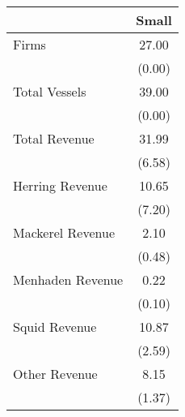 \begin{tabular}{l*{1}{c}}
\hline\hline
                &    Small\\
\hline
Firms           &    27.00\\
                &   (0.00)\\
Total Vessels   &    39.00\\
                &   (0.00)\\
Total Revenue   &    31.99\\
                &   (6.58)\\
Herring Revenue &    10.65\\
                &   (7.20)\\
Mackerel Revenue&     2.10\\
                &   (0.48)\\
Menhaden Revenue&     0.22\\
                &   (0.10)\\
Squid Revenue   &    10.87\\
                &   (2.59)\\
Other Revenue   &     8.15\\
                &   (1.37)\\
\hline\hline
\end{tabular}
